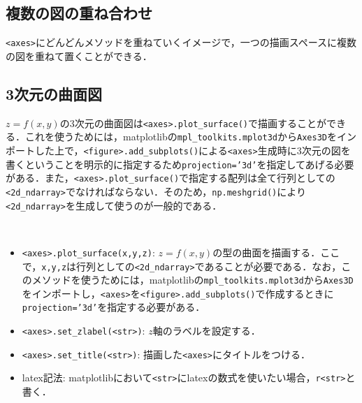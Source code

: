 \subsection{複数の図の重ね合わせ}

\texttt{<axes>}にどんどんメソッドを重ねていくイメージで，一つの描画スペースに複数の図を重ねて置くことができる．
\begin{cod}[\texttt{fig6.py}]　
}]{code/fig6.py}
\vspace{-19pt}
\begin{figure}[H]
\begin{center}
\framed
\texttt{[image: code/fig6.eps]}
\vspace{-10pt}
\caption{\texttt{fig6.eps}}
\endframed
\end{center}
\end{figure}
\end{cod}
\vspace{-20pt}

\subsection{3次元の曲面図}

$z=f(x,y)$の3次元の曲面図は\texttt{<axes>.plot\_surface()}で描画することができる．これを使うためには，matplotlibの\texttt{mpl\_toolkits.mplot3d}から\texttt{Axes3D}をインポートした上で，\texttt{<figure>.add\_subplots()}による\texttt{<axes>}生成時に3次元の図を書くということを明示的に指定するため\texttt{projection='3d'}を指定してあげる必要がある．また，\texttt{<axes>.plot\_surface()}で指定する配列は全て行列としての\texttt{<2d\_ndarray>}でなければならない．そのため，\texttt{np.meshgrid()}により\texttt{<2d\_ndarray>}を生成して使うのが一般的である．

\begin{gram}　
\begin{itemize}
\item \texttt{<axes>.plot\_surface(x,y,z)}: $z=f(x,y)$の型の曲面を描画する．ここで，\texttt{x,y,z}は行列としての\texttt{<2d\_ndarray>}であることが必要である．なお，このメソッドを使うためには，matplotlibの\texttt{mpl\_toolkits.mplot3d}から\texttt{Axes3D}をインポートし，\texttt{<axes>}を\texttt{<figure>.add\_subplots()}で作成するときに\texttt{projection='3d'}を指定する必要がある．
\item \texttt{<axes>.set\_zlabel(<str>)}: $z$軸のラベルを設定する．
\item \texttt{<axes>.set\_title(<str>)}: 描画した\texttt{<axes>}にタイトルをつける．
\item latex記法: matplotlibにおいて\texttt{<str>}にlatexの数式を使いたい場合，\texttt{r<str>}と書く．
\end{itemize}
\end{gram}

